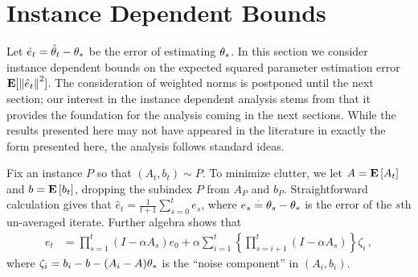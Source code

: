 \section{Instance Dependent Bounds}\label{sec:mainresults}
Let $\hat e_t = \hat \theta_t - \theta_*$ be the error of estimating $\theta_*$.
In this section we consider instance dependent bounds on the expected squared parameter estimation error $\mathbf{E}[ \left\| \hat e_t\right\|^2 ]$. 
The consideration of weighted norms is postponed until the next section;
our interest in the instance dependent analysis stems from that it 
provides the foundation for the analysis coming in the next sections. 
While the results presented here may not have appeared in the literature in exactly the form presented here, the analysis follows standard ideas. 
\iffalse
The core question is how the error depends on various instance-dependent quantities (variance of noise, spectral properties of matrices involved, the size of the initial error, etc.), how fast the error decreased over time.
As we shall see, if the constant step-size belongs to a small enough neighborhood of zero (the size of which depends on the instance), the error decreases at a rate of $O(1/t)$ and both too small and too large step-sizes are undesirable. The main result, \Cref{th:rate}, which bounds the error from above, is corroborated with a lower bound which shows that the upper bound is tight.
While the results of this section may not have appeared in this form in the literature, the steps of the analysis are quite standard. \todoc{I think we should say who we are building on.}
\fi

\iffalse
We first show that any  CALSA scheme  achieves an error of size$O(\frac{1}{t})$ with instance dependent constants and
step-size (see \Cref{th:rate}). In the \Cref{sec:land,sec:rl}, we investigate conditions under which this instance dependence can be eliminated such that we have \emph{universal} step-size choice and \emph{uniform} rates.
As a first step, we need show that there exists an instance dependent step-size such that the iterates are stable. To this end, it is useful to look at the error (of un-averaged iterates) $e_t\eqdef\theta_t-\ts$ given as below:
\fi
Fix an instance $P$ so that $(A_t,b_t)\sim P$. To minimize clutter, 
we let $A = \mathbf{E}\left[A_t\right]$ and $b = \mathbf{E}\left[b_t\right]$,
dropping the subindex $P$ from $A_P$ and $b_P$.
Straightforward calculation gives that $\hat e_t = \frac1{t+1} \sum_{s=0}^t e_s$, where
 $e_s\stackrel{\cdot}{=}\theta_s-\theta_*$ is the error of the $s$th un-averaged iterate. Further algebra shows that \begin{align}\label{eq:errrecmain}
e_t&={\prod_{s=1}^t \! (I-\alpha A_s) e_0}+\alpha{\sum_{i=1}^t\! \left\{\prod_{s=i+1}^t \!(I-\alpha A_s)\!\right\}\!\zeta_i}\,,
\end{align}
where $\zeta_i = b_i-b - (A_i -A)\theta_*$ is the ``noise component'' in $(A_i,b_i)$.

